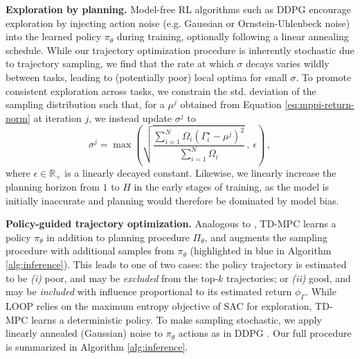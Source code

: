 \documentclass{article}
\begin{document}
\textbf{Exploration by planning.} Model-free RL algorithms such as DDPG \citep{Lillicrap2016ContinuousCW} encourage exploration by injecting action noise (e.g. Gaussian or Ornstein-Uhlenbeck noise) into the learned policy $\pi_{\theta}$ during training, optionally following a linear annealing schedule. While our trajectory optimization procedure is inherently stochastic due to trajectory sampling, we find that the rate at which $\sigma$ decays varies wildly between tasks, leading to (potentially poor) local optima for small $\sigma$. To promote consistent exploration across tasks, we constrain the std. deviation of the sampling distribution such that, for a $\mu^{j}$ obtained from Equation \ref{eq:mppi-return-norm} at iteration $j$, we instead update $\sigma^{j}$ to
\begin{equation}
    \label{eq:mppi-exploration}
    \sigma^{j} = \max\left(\sqrt{\frac{\sum_{i=1}^{N} \Omega_{i} (\Gamma_{i}^{\star} - \mu^{j})^{2}}{\sum_{i=1}^{N} \Omega_{i}}}\,,~\epsilon\right)\,,
\end{equation}
where $\epsilon \in \mathbb{R}_{+}$ is a linearly decayed constant. Likewise, we linearly increase the planning horizon from $1$ to $H$ in the early stages of training, as the model is initially inaccurate and planning would therefore be dominated by model bias.

\textbf{Policy-guided trajectory optimization.} Analogous to \citet{Schrittwieser2020MasteringAG, Sikchi2020LearningOW}, TD-MPC learns a policy $\pi_{\theta}$ in addition to planning procedure $\Pi_{\theta}$, and augments the sampling procedure with additional samples from $\pi_{\theta}$ (highlighted in {\color{MidnightBlue}blue} in Algorithm \ref{alg:inference}). This leads to one of two cases: the policy trajectory is estimated to be \textit{(i)} poor, and may be \emph{excluded} from the top-$k$ trajectories; or \textit{(ii)} good, and may be \emph{included} with influence proportional to its estimated return $\phi_{\Gamma}$. While LOOP relies on the maximum entropy objective of SAC \citep{Haarnoja2018SoftAA} for exploration, TD-MPC learns a deterministic policy. To make sampling stochastic, we apply linearly annealed (Gaussian) noise to $\pi_{\theta}$ actions as in DDPG \citep{Lillicrap2016ContinuousCW}. Our full procedure is summarized in Algorithm \ref{alg:inference}.

\vspace{-0.05in}
\end{document}

